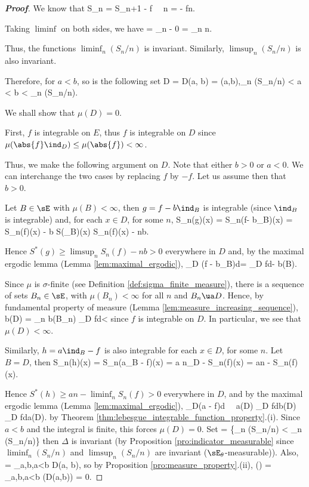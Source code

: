 \begin{proof}[\bf Proof]
We know that
\be
S_n \circ \theta = S_{n+1} - f  \ \ra \ n \circ \theta =  - \frac fn.
\ee

Taking $\liminf$ on both sides, we have
\be
{}\circ \theta = \liminf_n   - 0 = \liminf_n n.
\ee

Thus, the functions $\liminf_n(S_n/n)$ is invariant. Similarly, $\limsup_n(S_n/n)$ is also invariant.

Therefore, for $a < b$, so is the following set
\be
D = D(a, b) = (a,b),\quad\quad \liminf_n (S_n/n) < a < b < \limsup_n (S_n/n).
\ee

We shall show that $\mu(D) = 0$.

First, $f$ is integrable on $E$, thus $f$ is integrable on $D$ since $\mu(\abs{f}\ind_D) \leq \mu (\abs{f}) < \infty$.

Thus, we make the following argument on $D$. Note that either $b > 0$ or $a < 0$. We can interchange the two cases by replacing $f$ by $-f$. Let us assume then that $b > 0$.

Let $B \in \sE$ with $\mu(B) < \infty$, then $g = f - b\ind_B$ is integrable (since $\ind_B$ is integrable) and, for each $x \in D$, for some $n$,
\be
S_n(g)(x) = S_n(f- b\ind_B)(x) = S_n(f)(x) - b S(\ind_B)(x) \geq S_n(f)(x) - nb.
\ee

Hence $S^*(g) \geq \limsup_n S_n(f) - nb > 0$ everywhere in $D$ and, by the maximal ergodic lemma (Lemma \ref{lem:maximal_ergodic}),
 \leq \int_D (f - b\ind_B)d\mu = \int_D fd\mu - b\mu(B).
\ee

Since $\mu$ is $\sigma$-finite (see Definition \ref{def:sigma_finite_measure}), there is a sequence of sets $B_n \in \sE$, with $\mu(B_n) < \infty$ for all $n$ and $B_n \ua D$. Hence, by fundamental property of measure (Lemma \ref{lem:measure_increasing_sequence}),
\be
b\mu(D) = \lim_{n\to\infty} b\mu(B_n) \leq \int_D fd\mu < \infty
\ee
since $f$ is integrable on $D$. In particular, we see that $\mu(D) < \infty$.

Similarly, $h = a\ind_B - f$ is also integrable for each $x \in D$, for some $n$. Let $B=D$, then
\be
S_n(h)(x) = S_n(a\ind_B - f)(x) = a n\ind_D - S_n(f)(x) = an - S_n(f)(x).
\ee

Hence $S^*(h) \geq an - \liminf_n S_n(f) > 0$ everywhere in $D$, and by the maximal ergodic lemma (Lemma \ref{lem:maximal_ergodic}),
\be
\int_D(a - f)d\mu {} \ \ra \ a\mu(D) \geq \int_D fd\mu \quad\ra\quad b\mu(D) \leq \int_D fd\mu \leq a\mu(D).
\ee
by Theorem \ref{thm:lebesgue_integrable_function_property}.(i). Since $a < b$ and the integral is finite, this forces $\mu(D) = 0$. Set
\be
\Delta = \left\{\liminf_n (S_n/n) < \limsup_n (S_n/n)\right\}
\ee
then $\Delta$ is invariant (by Proposition \ref{pro:indicator_measurable} since $\liminf_n (S_n/n)$ and $\limsup_n (S_n/n)$ are invariant ($\sE_\theta$-measurable)). Also,
\be
\Delta = \bigcup_{a,b\in\Q,a<b} D(a, b),
\ee
so by Proposition \ref{pro:measure_property}.(ii),
\be
\mu(\Delta) = \mu {} \leq \sum_{a,b\in\Q,a<b} \mu(D(a,b)) = 0.
\ee


\end{proof}
